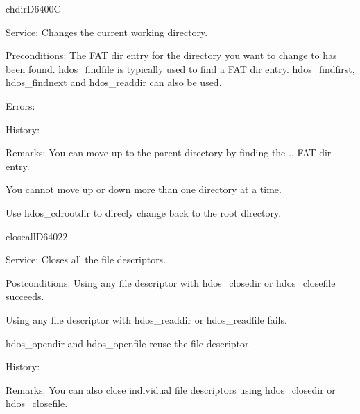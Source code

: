 \begin{hyppotrap}{chdir}{D640}{0C}
\item [Service:]
  Changes the current working directory.
\item [Preconditions:]
  The FAT dir entry for the directory you want to change to has been
  found. hdos\_findfile is typically used to find a FAT dir entry.
  hdos\_findfirst, hdos\_findnext and hdos\_readdir can also be used.
\item [Errors:]
\item [History:]
\item [Remarks:]
  You can move up to the parent directory by finding the .. FAT dir entry.

  You cannot move up or down more than one directory at a time.

  Use hdos\_cdrootdir to direcly change back to the root directory.
\end{hyppotrap}


\newpage
\begin{hyppotrap}{closeall}{D640}{22}
\item [Service:]
  Closes all the file descriptors.
\item [Postconditions:]
  Using any file descriptor with hdos\_closedir or hdos\_closefile succeeds.

  Using any file descriptor with hdos\_readdir or hdos\_readfile fails.

  hdos\_opendir and hdos\_openfile reuse the file descriptor.
\item [History:]
\item [Remarks:]
  You can also close individual file descriptors using hdos\_closedir or
  hdos\_closefile.
\end{hyppotrap}


